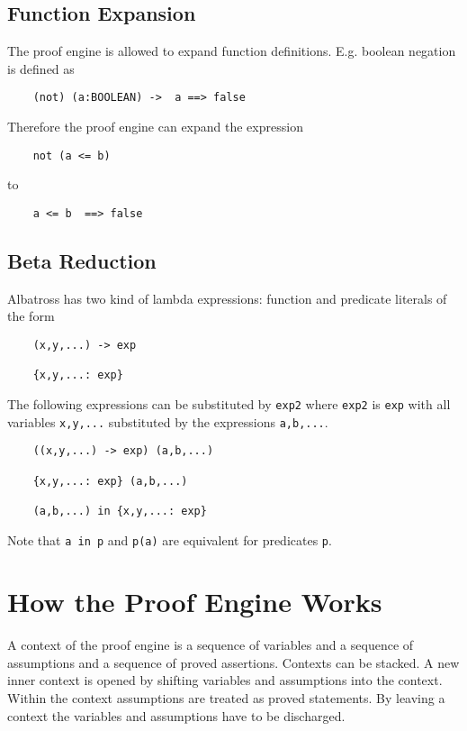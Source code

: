 \subsection{Function Expansion}

The proof engine is allowed to expand function definitions. E.g. boolean
negation is defined as
%
\begin{lstlisting}
    (not) (a:BOOLEAN) ->  a ==> false
\end{lstlisting}
%
Therefore the proof engine can expand the expression
%
\begin{lstlisting}
    not (a <= b)
\end{lstlisting}
%
to
%
\begin{lstlisting}
    a <= b  ==> false
\end{lstlisting}


\subsection{Beta Reduction}

Albatross has two kind of lambda expressions: function and predicate literals
of the form
%
\begin{lstlisting}
    (x,y,...) -> exp

    {x,y,...: exp}
\end{lstlisting}
%
The following expressions can be substituted by \lstinline!exp2! where
\lstinline!exp2! is \lstinline!exp!  with all variables \lstinline!x,y,...!
substituted by the expressions \lstinline!a,b,...!.
%
\begin{lstlisting}
    ((x,y,...) -> exp) (a,b,...)

    {x,y,...: exp} (a,b,...)

    (a,b,...) in {x,y,...: exp}
\end{lstlisting}
Note that \lstinline!a in p! and \lstinline!p(a)! are equivalent for
predicates \lstinline!p!.



\section{How the Proof Engine Works}

A context of the proof engine is a sequence of variables and a sequence of
assumptions and a sequence of proved assertions. Contexts can be stacked. A
new inner context is opened by shifting variables and assumptions into the
context. Within the context assumptions are treated as proved statements. By
leaving a context the variables and assumptions have to be discharged.

